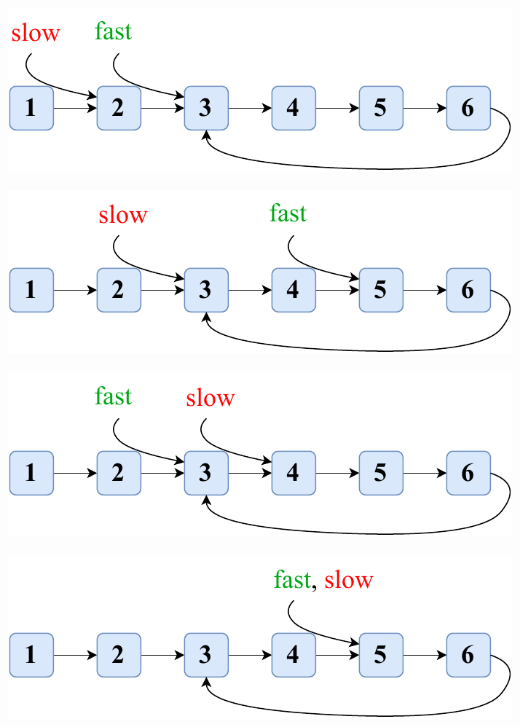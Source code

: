 \documentclass[utf8,14pt,a4paper,oneside,russian]{book}
\begin{document}
	\begin{center}
		\includegraphics[scale=0.8]{2}\\
	\end{center}
	
	\begin{center}
		\includegraphics[scale=0.8]{3}\\
	\end{center}
	
	\begin{center}
		\includegraphics[scale=0.8]{4}\\
	\end{center}
	
	\begin{center}
		\includegraphics[scale=0.8]{5}\\
	\end{center}
	
\end{document}
